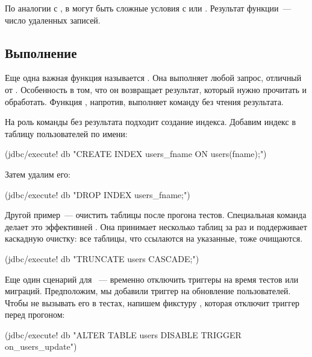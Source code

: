 По аналогии с , в  могут быть сложные условия с  или . Результат функции~--- число удаленных записей.

\subsection{Выполнение}

Еще одна важная функция называется . Она выполняет любой запрос, отличный от . Особенность  в том, что он возвращает результат, который нужно прочитать и обработать. Функция , напротив, выполняет команду без чтения результата.

На роль команды без результата подходит создание индекса. Добавим индекс в таблицу пользователей по имени:

\begin{english}
  \begin{clojure}
(jdbc/execute! db
  "CREATE INDEX users_fname ON users(fname);")
  \end{clojure}
\end{english}

Затем удалим его:

\begin{english}
  \begin{clojure}
(jdbc/execute! db "DROP INDEX users_fname;")
  \end{clojure}
\end{english}

Другой пример~--- очистить таблицы после прогона тестов. Специальная команда  делает это эффективней . Она принимает несколько таблиц за раз и поддерживает каскадную очистку: все таблицы, что ссылаются на указанные, тоже очищаются.

\begin{english}
  \begin{clojure}
(jdbc/execute! db "TRUNCATE users CASCADE;")
  \end{clojure}
\end{english}

Еще один сценарий для ~--- временно отключить триггеры на время тестов или миграций. Предположим, мы добавили триггер на обновление пользователей. Чтобы не вызывать его в тестах, напишем фикстуру , которая отключит триггер перед прогоном:

\begin{english}
  \begin{clojure}
(jdbc/execute! db
  "ALTER TABLE users DISABLE TRIGGER on_users_update")
  \end{clojure}
\end{english}


